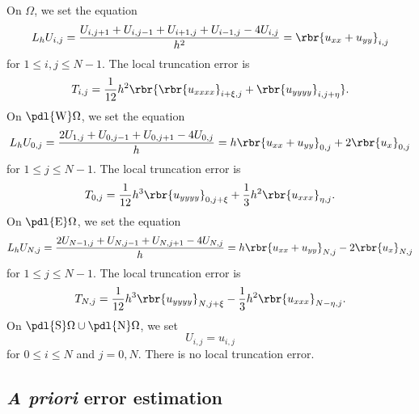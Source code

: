 \documentclass[english, nochinese]{pnote}
\begin{document}
On $\Omega$, we set the equation
\begin{equation}
L_h U_{ i, j } = \frac{ U_{ i, j + 1 } + U_{ i, j - 1 } + U_{ i + 1, j } + U_{ i - 1, j } - 4 U_{ i, j } }{h^2} = \rbr{ u_{ x x } + u_{ y y } }_{ i, j }
\end{equation}
for $ 1 \le i, j \le N - 1 $. The local truncation error is
\begin{equation}
T_{ i, j } = \frac{1}{12} h^2 \rbr{ \rbr{u_{ x x x x }}_{ i + \xi, j } + \rbr{u_{ y y y y }}_{ i, j + \eta } }.
\end{equation}
On $ \pdl{\text{W}} \Omega $, we set the equation
\begin{equation}
L_h U_{ 0, j } = \frac{ 2 U_{ 1, j } + U_{ 0, j - 1 } + U_{ 0, j + 1 } - 4 U_{ 0, j } }{h} = h \rbr{ u_{ x x } + u_{ y y } }_{ 0, j } + 2 \rbr{u_x}_{ 0, j }
\end{equation}
for $ 1 \le j \le N - 1 $. The local truncation error is
\begin{equation}
T_{ 0, j } = \frac{1}{12} h^3 \rbr{u_{ y y y y }}_{ 0, j + \xi } + \frac{1}{3} h^2 \rbr{u_{ x x x }}_{ \eta, j }.
\end{equation}
On $ \pdl{\text{E}} \Omega $, we set the equation
\begin{equation}
L_h U_{ N, j } = \frac{ 2 U_{ N - 1, j } + U_{ N, j - 1 } + U_{ N, j + 1 } - 4 U_{ N, j } }{h} = h \rbr{ u_{ x x } + u_{ y y } }_{ N, j } - 2 \rbr{u_x}_{ N, j }
\end{equation}
for $ 1 \le j \le N - 1 $. The local truncation error is
\begin{equation}
T_{ N, j } = \frac{1}{12} h^3 \rbr{u_{ y y y y }}_{ N, j + \xi } - \frac{1}{3} h^2 \rbr{u_{ x x x }}_{ N - \eta, j }.
\end{equation}
On $ \pdl{\text{S}} \Omega \cup \pdl{\text{N}} \Omega $, we set
\begin{equation}
U_{ i, j } = u_{ i, j }
\end{equation}
for $ 0 \le i \le N $ and $ j = 0, N $. There is no local truncation error.

\subsection{\textit{A priori} error estimation}
\end{document}
